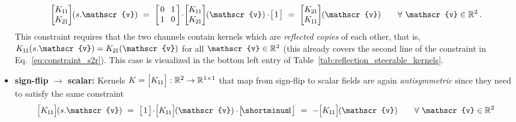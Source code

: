 \begin{itemize}
\begin{align}
                \begin{bmatrix} \Koo \\ \Kto \end{bmatrix} \mkern-4mu (s.\mathscr{v})
            \ =\ 
                \begin{bmatrix} \hspace{1.5pt} 0 &\mkern-4mu 1 \hspace*{1.5pt} \\ \hspace{1.5pt} 1 &\mkern-4mu 0 \hspace*{1.5pt} \end{bmatrix}
                \!\cdot\!
                \begin{bmatrix} \Koo \\ \Kto \end{bmatrix} \mkern-4mu (\mathscr{v})
                \cdot\!
                \big[\mkern2mu 1 \mkern2mu\big]
            \ =\ 
                \begin{bmatrix} \Kto \\ \Koo \end{bmatrix} \mkern-4mu (\mathscr{v})
            \qquad \forall\ \mathscr{v} \in \R^2 \,.
        \end{align}
        This constraint requires that the two channels contain kernels which are \emph{reflected copies} of each other, that is,
        $\Koo(s.\mathscr{v}) = \Kto(\mathscr{v})$ for all $\mathscr{v} \in \R^2$
        (this already covers the second line of the constraint in Eq.~\eqref{eq:constraint_s2r}).
        This case is visualized in the bottom left entry of Table~\ref{tab:reflection_steerable_kernels}.
    \item[{\rule[2.0pt]{2pt}{2pt}}]
    \textbf{sign-flip $\bm\to$ scalar:}
        Kernels
        $K = \pig[\Koo\pig]: \R^2 \to \R^{1\times1}$
        that map from sign-flip to scalar fields are again \emph{antisymmetric} since they need to satisfy the same constraint
        \begin{align}
                \pig[\Koo\pig] \mkern-1mu (s.\mathscr{v})
            \ =\ 
                \big[\mkern2mu 1 \mkern2mu\big]
                \!\cdot\!
                \pig[\Koo\pig] \mkern-1mu (\mathscr{v})
                \cdot\!
                \big[\! \shortminus\!1 \big]
            \ =\ 
                -\pig[\Koo\pig] \mkern-1mu (\mathscr{v})
            \qquad \forall\ \mathscr{v} \in \R^2
        \end{align}

\end{itemize}
